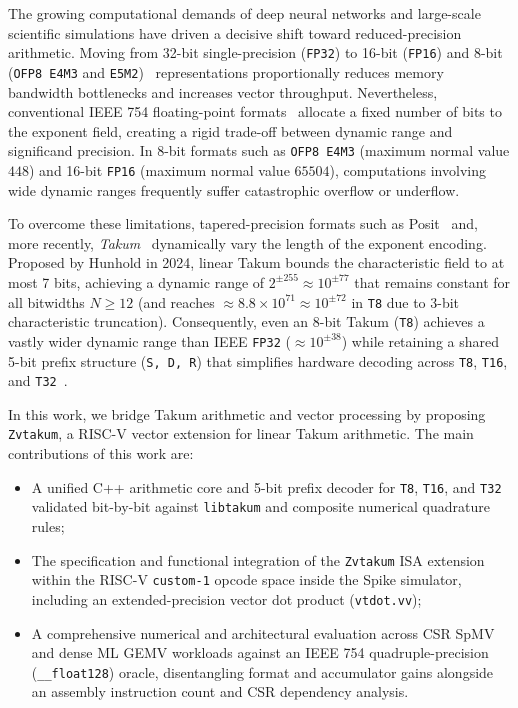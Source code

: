 \documentclass[conference]{IEEEtran}
\begin{document}
The growing computational demands of deep neural networks and large-scale scientific simulations have driven a decisive shift toward reduced-precision arithmetic. Moving from 32-bit single-precision (\texttt{FP32}) to 16-bit (\texttt{FP16}) and 8-bit (\texttt{OFP8 E4M3} and \texttt{E5M2})~\cite{ocp_fp8} representations proportionally reduces memory bandwidth bottlenecks and increases vector throughput. Nevertheless, conventional IEEE 754 floating-point formats~\cite{ieee754} allocate a fixed number of bits to the exponent field, creating a rigid trade-off between dynamic range and significand precision. In 8-bit formats such as \texttt{OFP8 E4M3} (maximum normal value $448$) and 16-bit \texttt{FP16} (maximum normal value $65504$), computations involving wide dynamic ranges frequently suffer catastrophic overflow or underflow.

To overcome these limitations, tapered-precision formats such as Posit~\cite{gustafson2017posit} and, more recently, \emph{Takum}~\cite{hunhold2024takum} dynamically vary the length of the exponent encoding. Proposed by Hunhold in 2024, linear Takum bounds the characteristic field to at most 7 bits, achieving a dynamic range of $2^{\pm 255} \approx 10^{\pm 77}$ that remains constant for all bitwidths $N \ge 12$ (and reaches $\approx 8.8 \times 10^{71} \approx 10^{\pm 72}$ in \texttt{T8} due to 3-bit characteristic truncation). Consequently, even an 8-bit Takum (\texttt{T8}) achieves a vastly wider dynamic range than IEEE \texttt{FP32} ($\approx 10^{\pm 38}$) while retaining a shared 5-bit prefix structure (\texttt{S, D, R}) that simplifies hardware decoding across \texttt{T8}, \texttt{T16}, and \texttt{T32}~\cite{hunhold2025avx}.

In this work, we bridge Takum arithmetic and vector processing by proposing \texttt{Zvtakum}, a RISC-V vector extension for linear Takum arithmetic. The main contributions of this work are:
\begin{itemize}
    \item A unified C++ arithmetic core and 5-bit prefix decoder for \texttt{T8}, \texttt{T16}, and \texttt{T32} validated bit-by-bit against \texttt{libtakum} and composite numerical quadrature rules;
    \item The specification and functional integration of the \texttt{Zvtakum} ISA extension within the RISC-V \texttt{custom-1} opcode space inside the Spike simulator, including an extended-precision vector dot product (\texttt{vtdot.vv});
    \item A comprehensive numerical and architectural evaluation across CSR SpMV and dense ML GEMV workloads against an IEEE 754 quadruple-precision (\texttt{\_\_float128}) oracle, disentangling format and accumulator gains alongside an assembly instruction count and CSR dependency analysis.
\end{itemize}
\end{document}
